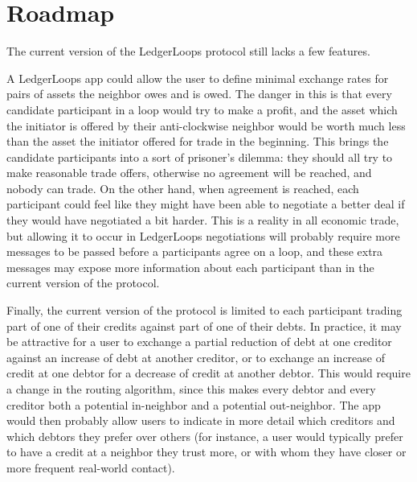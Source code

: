 \documentclass[11pt,twoside,a4paper]{article}
\begin{document}
\section{Roadmap}
The current version of the LedgerLoops protocol still lacks a few features. 

A LedgerLoops app could allow the user to define minimal exchange rates for pairs of assets the neighbor owes and is owed. The danger in this is that every candidate participant in a loop would try to make a profit, and the asset which the initiator is offered by their anti-clockwise neighbor would be worth much less than the asset the initiator offered for trade in the beginning. This brings the candidate participants into a sort of prisoner's dilemma: they should all try to make reasonable trade offers, otherwise no agreement will be reached, and nobody can trade. On the other hand, when agreement is reached, each participant could feel like they might have been able to negotiate a better deal if they would have negotiated a bit harder. This is a reality in all economic trade, but allowing it to occur in LedgerLoops negotiations will probably require more messages to be passed before a participants agree on a loop, and these extra messages may expose more information about each participant than in the current version of the protocol.

Finally, the current version of the protocol is limited to each participant trading part of one of their credits against part of one of their debts. In practice, it may be attractive for a user to exchange a partial reduction of debt at one creditor against an increase of debt at another creditor, or to exchange an increase of credit at one debtor for a decrease of credit at another debtor. This would require a change in the routing algorithm, since this makes every debtor and every creditor both a potential in-neighbor and a potential out-neighbor. The app would then probably allow users to indicate in more detail which creditors and which debtors they prefer over others (for instance, a user would typically prefer to have a credit at a neighbor they trust more, or with whom they have closer or more frequent real-world contact).
\end{document}
